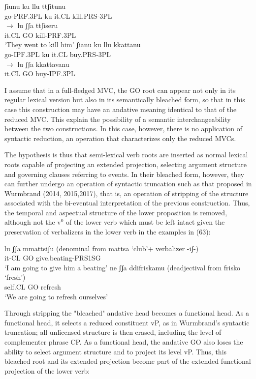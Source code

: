 \documentclass[output=paper,colorlinks,citecolor=brown,
]{langscibook}
\begin{document}
\ea
    \ea
        \ea \gll ʃiunu ku llu ttʃitunu\\
        go-PRF.3PL ku it.CL kill.PRS-3PL\\
        \ex $\rightarrow$ \gll lu    ʃʃa   ttʃiseru\\
        it.CL  GO  kill-PRF.3PL\\
        \glt ‘They went to kill him’
        \z
    \ex
        \ea \gll ʃianu ku  llu kkattanu\\
        go-IPF.3PL ku it.CL buy.PRS-3PL\\
        \ex $\rightarrow$ \gll lu ʃʃa  kkattavanu\\
        it.CL GO  buy-IPF.3PL\\
        \z
    \z
\z

I assume that in a full-fledged MVC, the GO root can appear not only in its regular lexical version but also in its semantically bleached form, so that in this case this construction may have an andative meaning identical to that of the reduced MVC. This explain the possibility of a semantic interchangeability between the two constructions.  In this case, however, there is no application of syntactic reduction, an operation that characterizes only the reduced MVCs.

The hypothesis is thus that semi-lexical verb roots are inserted as normal lexical roots capable of projecting an extended projection, selecting argument structure and governing clauses referring to events.  In their bleached form, however, they can further undergo an operation of syntactic truncation such as that proposed in Wurmbrand  (2014, 2015,2017), that is, an operation of stripping of the structure associated with the bi-eventual interpretation of the previous construction. Thus, the temporal and aspectual structure of the lower proposition is removed, although not the v$^0$ of the lower verb which must be left intact given the preservation of verbalizers in the lower verb in the examples in (63):

\ea
    \ea \gll lu     ʃʃa  mmattsiʃu  (denominal from mattsa ‘club’+ verbalizer -iʃ-)\\
 it-CL GO  give.beating-PRS1SG\\
 \glt ‘I am going to give him a beating’
    \ex \gll ne    ʃʃa   ddifriskamu (deadjectival from frisko ‘fresh’)\\
 self.CL  GO  refresh\\
 \glt ‘We are going to refresh ourselves’
    \z
\z

Through stripping the "bleached" andative head becomes a functional head. As a functional head, it selects a reduced constituent vP, as in Wurmbrand's syntactic truncation; all unlicensed structure is then erased, including the level of complementer  phrase CP. As a functional head, the andative GO  also loses the ability to select argument structure and to project its level vP. Thus, this bleached root and its extended projection become part of the extended functional projection of the lower verb: 
\end{document}
